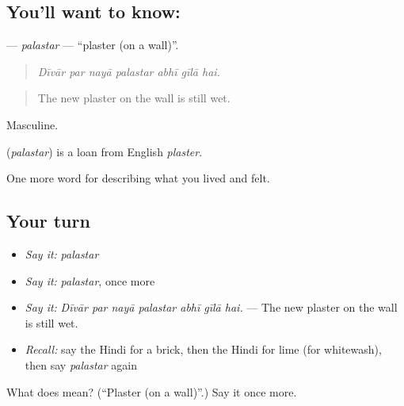 \subsection*{You'll want to know: }
\textbf{} — \emph{palastar} — \textquotedblleft{}plaster (on a wall)\textquotedblright{}.

\begin{quote}
      
\end{quote}

\begin{quote}
\emph{Dīvār par nayā palastar abhī gīlā hai.}
\end{quote}

\begin{quote}
The new plaster on the wall is still wet.
\end{quote}

Masculine.

\begin{cousinweb}
\textbf{} (\emph{palastar}) is a loan from English \emph{plaster}.
\end{cousinweb}

\begin{grammarlens}[title={What you've built}]
One more word for describing what you lived and felt.
\end{grammarlens}

\subsection*{Your turn}
\begin{itemize}
\raggedright
  \item \emph{Say it:} \emph{palastar}
  \item \emph{Say it:} \emph{palastar}, once more
  \item \emph{Say it:} \emph{Dīvār par nayā palastar abhī gīlā hai.} — The new plaster on the wall is still wet.
  \item \emph{Recall:} say the Hindi for a brick, then the Hindi for lime (for whitewash), then say \emph{palastar} again
\end{itemize}

\begin{tcolorbox}[breakable,colback=teal!4,colframe=teal!35!black,title={Before you move on}]
What does  mean? (\textquotedblleft{}Plaster (on a wall)\textquotedblright{}.) Say it once more.
\end{tcolorbox}
